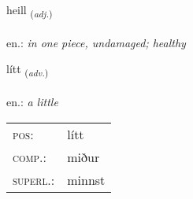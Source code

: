 \documentclass[frontgrid, backgrid]{flacards}\usepackage[]{graphicx}\usepackage[]{xcolor}
\begin{document}
\renewcommand{\flhead}{\vskip5pt \fboxsep=0pt {\small\bfseries\footnotesize Lýsingarorð | Adjective}}
\renewcommand{\fcfoot}{\vskip5pt \fboxsep=0pt \hspace{2pt}{\small\bfseries\footnotesize 1K}}

\renewcommand{\blhead}{\vskip5pt {\small\bfseries\footnotesize Lýsingarorð | Adjective }}
\renewcommand{\bcfoot}{\vskip5pt \hspace{2pt}{\small\bfseries\footnotesize 1K}}


{heill \small{\textsubscript{(\textit{adj.})}} \\[1ex] %
\textphonetic{[heitl̥]} \\
en.: \emph{in one piece, undamaged; healthy} \\  [2ex]
\renewcommand*{\arraystretch}{0.8}
}

\renewcommand{\flhead}{\vskip5pt \fboxsep=0pt {\small\bfseries\footnotesize Atviksorð | Adverb}}
\renewcommand{\fcfoot}{\vskip5pt \fboxsep=0pt \hspace{2pt}{\small\bfseries\footnotesize 1K}}

\renewcommand{\blhead}{\vskip5pt {\small\bfseries\footnotesize Atviksorð | Adverb }}
\renewcommand{\bcfoot}{\vskip5pt \hspace{2pt}{\small\bfseries\footnotesize 1K}}


{lítt \small{\textsubscript{(\textit{adv.})}} \\[1ex] %
\textphonetic{[liht]} \\
en.: \emph{a little} \\  [2ex]
\renewcommand*{\arraystretch}{0.8}
\begin{tabular}{ll}
\textsc{pos}: & lítt \\ 
\textsc{comp.}: & miður \\ 
\textsc{superl.}: & minnst \\
\end{tabular}
}
\end{document}
